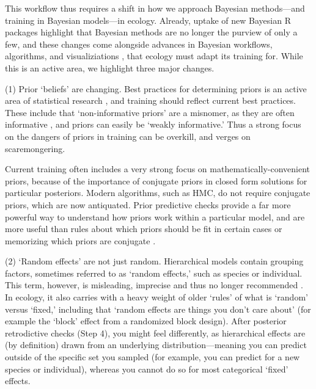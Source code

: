 \documentclass[11pt]{article}
\begin{document}
This workflow thus requires a shift in how we approach Bayesian methods---and training in Bayesian models---in ecology. Already, uptake of new Bayesian \textsf{R} packages highlight that Bayesian methods are no longer the purview of only a few, and these changes come alongside advances in Bayesian workflows, algorithms, and visualiziations \citep[e.g.][]{betanworkflow,vandeschoot2021,gabryvis}, that ecology must adapt its training for. While this is an active area, we highlight three major changes.

(1) Prior `beliefs' are changing. Best practices for determining priors is an active area of statistical research \citep{BDA,regotherstories,betanprior}, and training should reflect current best practices. These include that `non-informative priors' are a misnomer, as they are often informative  \citep{lemoine2019}, and priors can easily be `weakly informative.' Thus a strong focus on the dangers of priors in training can be overkill, and verges on scaremongering. %

Current training often includes a very strong focus on mathematically-convenient priors, because of the importance of conjugate priors in closed form solutions for particular posteriors. Modern algorithms, such as HMC, do not require conjugate priors, which are now antiquated. Prior predictive checks provide a far more powerful way to understand how priors work within a particular model, and are more useful than rules about which priors should be fit in certain cases or memorizing which priors are conjugate \citep{betanprior}. %

(2) `Random effects' are not just random. Hierarchical models contain grouping factors, sometimes referred to as `random effects,' such as species or individual. This term, however, is misleading, imprecise and thus no longer recommended \citep{gelmanhill}. In ecology, it also carries with a heavy weight of older `rules' of what is `random' versus `fixed,' including that `random effects are things you don't care about' (for example the `block' effect from a randomized block design). After posterior retrodictive checks (Step 4), you might feel differently, as hierarchical effects are (by definition) drawn from an underlying distribution---meaning you can predict outside of the specific set you sampled (for example, you can predict for a new species or individual), whereas you cannot do so for most categorical `fixed' effects.
\end{document}
